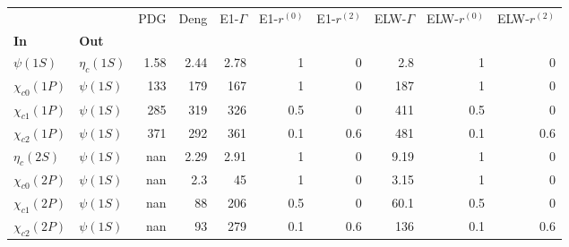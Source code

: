 \begin{tabular}{l|l|r|r|r|r|r|r|r|r}
\toprule
                &            &  PDG &  Deng &  E1-$\Gamma$ &  E1-$r^{(0)}$ &  E1-$r^{(2)}$ &  ELW-$\Gamma$ &  ELW-$r^{(0)}$ &  ELW-$r^{(2)}$ \\
\textbf{In} & \textbf{Out} &      &       &              &               &               &               &                &                \\
\midrule
\textbf{$\psi(1S)$} & \textbf{$\eta_{c}(1S)$} & 1.58 &  2.44 &         2.78 &             1 &             0 &           2.8 &              1 &              0 \\
\textbf{$\chi_{c0}(1P)$} & \textbf{$\psi(1S)$} &  133 &   179 &          167 &             1 &             0 &           187 &              1 &              0 \\
\textbf{$\chi_{c1}(1P)$} & \textbf{$\psi(1S)$} &  285 &   319 &          326 &           0.5 &             0 &           411 &            0.5 &              0 \\
\textbf{$\chi_{c2}(1P)$} & \textbf{$\psi(1S)$} &  371 &   292 &          361 &           0.1 &           0.6 &           481 &            0.1 &            0.6 \\
\textbf{$\eta_{c}(2S)$} & \textbf{$\psi(1S)$} &  nan &  2.29 &         2.91 &             1 &             0 &          9.19 &              1 &              0 \\
\textbf{$\chi_{c0}(2P)$} & \textbf{$\psi(1S)$} &  nan &   2.3 &           45 &             1 &             0 &          3.15 &              1 &              0 \\
\textbf{$\chi_{c1}(2P)$} & \textbf{$\psi(1S)$} &  nan &    88 &          206 &           0.5 &             0 &          60.1 &            0.5 &              0 \\
\textbf{$\chi_{c2}(2P)$} & \textbf{$\psi(1S)$} &  nan &    93 &          279 &           0.1 &           0.6 &           136 &            0.1 &            0.6 \\
\bottomrule
\end{tabular}
